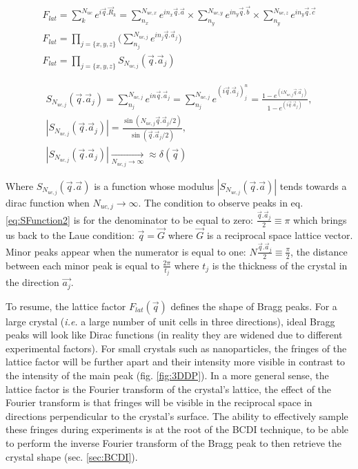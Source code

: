 \begin{gather}
    \label{eq:LatFactor}
    F_{lat} = \sum_k^{N_{uc}} e^{i\vec{q}.\vec{R}_k} = \sum_{n_x}^{N_{uc, x}} e^{i n_x\vec{q}.\vec{a}} \times \sum_{n_y}^{N_{uc, y}} e^{i n_y\vec{q}.\vec{b}} \times \sum_{n_y}^{N_{uc, z}} e^{i n_y\vec{q}.\vec{c}}\\
    F_{lat} = \prod_{j=\{x,y,z\}} \Bigg( \sum_{n_j}^{N_{uc, j}} e^{i n_j\vec{q}.\vec{a}_j} \Bigg)\\
    F_{lat} = \prod_{j=\{x,y,z\}} S_{N_{uc, j}}(\vec{q}.\vec{a}_j)
\end{gather}

\begin{gather}
    \label{eq:SFunction1}
    S_{N_{uc, j}}(\vec{q}.\vec{a}_j) = \sum_{n_j}^{N_{uc, j}} e^{in\vec{q}.\vec{a}_j} = \sum_{n_j}^{N_{uc, j}} e^{(i\vec{q}.\vec{a}_j)^n_j} = \frac{1-e^{(i N_{uc, j} \vec{q}.\vec{a}_j)}}{1-e^{(i\vec{q}.\vec{a}_j)}},\\
    \label{eq:SFunction2}
    |S_{N_{uc, j}}(\vec{q}.\vec{a}_j)| = \frac{\sin(N_{uc, j} \vec{q}.\vec{a}_j/2)}{\sin(\vec{q}.\vec{a}_j/2)},\\
    \label{eq:SFunction3}
    |S_{N_{uc, j}}(\vec{q}.\vec{a}_j)| \underset{N_{uc, j} \to \infty}{\longrightarrow} \approx \delta (\vec{q})
\end{gather}

Where $S_{N_{uc, j}}(\vec{q}.\vec{a})$ is a function whose modulus $|S_{N_{uc, j}}(\vec{q}.\vec{a})|$ tends towards a dirac function when $N_{uc, j} \longrightarrow \infty$.
The condition to observe peaks in eq. \ref{eq:SFunction2} is for the denominator to be equal to zero: $\frac{\vec{q}.\vec{a}_j}{2} \equiv \pi$ which brings us back to the Laue condition: $\vec{q} = \vec{G}$ where $\vec{G}$ is a reciprocal space lattice vector.
Minor peaks appear when the numerator is equal to one: $N\frac{\vec{q}.\vec{a}_j}{2} \equiv \frac{\pi}{2}$, the distance between each minor peak is equal to $\frac{2\pi}{t_j}$ where $t_j$ is the thickness of the crystal in the direction $\vec{a_j}$.

To resume, the lattice factor $F_{lat}(\vec{q})$ defines the shape of Bragg peaks.
For a large crystal (\textit{i.e.} a large number of unit cells in three directions), ideal Bragg peaks will look like Dirac functions (in reality they are widened due to different experimental factors).
For small crystals such as nanoparticles, the fringes of the lattice factor will be further apart and their intensity more visible in contrast to the intensity of the main peak (fig. \ref{fig:3DDP}).
In a more general sense, the lattice factor is the Fourier transform of the crystal's lattice, the effect of the Fourier transform is that fringes will be visible in the reciprocal space in directions perpendicular to the crystal's surface.
The ability to effectively sample these fringes during experiments is at the root of the BCDI technique, to be able to perform the inverse Fourier transform of the Bragg peak to then retrieve the crystal shape (sec. \ref{sec:BCDI}).

